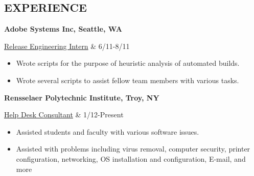 \documentclass[margin,11pt]{res} %
\begin{document}
\begin{resume}
\section{EXPERIENCE}     {\bf Adobe Systems Inc, Seattle, WA}  \\
                \begin{ncolumn}{2} %
                \underline{Release Engineering Intern} & \hfill 6/11-8/11
                \end{ncolumn}
\begin{itemize}
\item Wrote scripts for the purpose of heuristic analysis of automated builds.
\item Wrote several scripts to assist fellow team members with various tasks.
\end{itemize}

                {\bf Rensselaer Polytechnic Institute, Troy, NY} \\
                \begin{ncolumn}{2}
                \underline{Help Desk Consultant} & \hfill 1/12-Present
                \end{ncolumn}
\begin{itemize}
\item Assisted students and faculty with various software issues.
\item Assisted with problems including virus removal, computer security, printer configuration, networking, OS installation and configuration, E-mail, and more
\end{itemize}


\end{resume}
\end{document}
